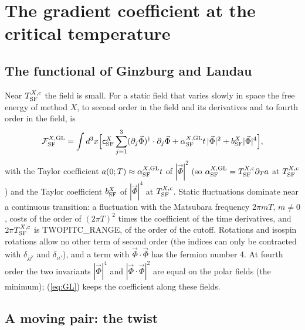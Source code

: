 \documentclass[aps,prd,onecolumn,superscriptaddress,nofootinbib,floatfix,longbibliography]{revtex4-2}
\newcommand{\SF}{{\rm SF}}
\begin{document}
\section{The gradient coefficient at the critical temperature}
\label{sec:gradient}

\subsection{The functional of Ginzburg and Landau}

Near $T^{X,{\rm c}}_\SF$ the field is small. For a static field that varies slowly in space the free energy of method $X$, to second
order in the field and its derivatives and to fourth order in the field, is
\begin{equation}
\mathcal F^{X,{\rm GL}}_\SF=\int d^3x\Big[\mathsf c^X_\SF\sum_{j=1}^3(\partial_j\vec\Phi)^\dagger\cdot\partial_j\vec\Phi+\alpha^{X,{\rm GL}}_\SF t\,|\vec\Phi|^2+b^X_\SF|\vec\Phi|^4\Big],
\label{eq:GL}
\end{equation}
with the Taylor coefficient $a(0;T)\approx\alpha^{X,{\rm GL}}_\SF t$ of $|\vec\Phi|^2$ (so $\alpha^{X,{\rm GL}}_\SF=T^{X,{\rm c}}_\SF\partial_Ta$ at
$T^{X,{\rm c}}_\SF$) and the Taylor coefficient $b^X_\SF$ of $|\vec\Phi|^4$ at $T^{X,{\rm c}}_\SF$. Static fluctuations dominate near a continuous
transition: a fluctuation with the Matsubara frequency $2\pi mT$, $m\ne0$, costs of the order of $(2\pi T)^2$ times the coefficient of
the time derivatives, and $2\pi T^{X,{\rm c}}_\SF$ is {{TWOPITC_RANGE}}, of the order of the cutoff. Rotations and isospin rotations allow no
other term of second order (the indices can only be contracted with $\delta_{jj'}$ and $\delta_{\iota\iota'}$), and a term with
$\vec\Phi\cdot\vec\Phi$ has the fermion number 4. At fourth order the two invariants $|\vec\Phi|^4$ and $|\vec\Phi\cdot\vec\Phi|^2$ are equal on
the polar fields (the minimum); (\ref{eq:GL}) keeps the coefficient along these fields.

\subsection{A moving pair: the twist}
\end{document}
